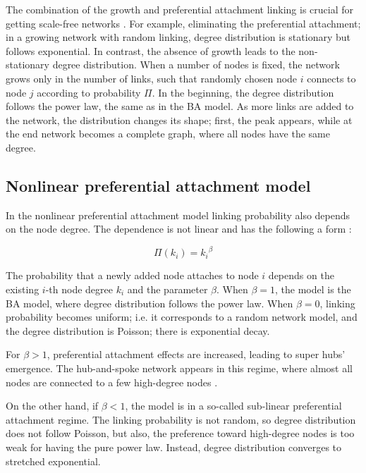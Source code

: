 The combination of the growth and preferential attachment linking is crucial for getting scale-free networks \cite{barabasi1999}. For example, eliminating the preferential attachment; in a growing network with random linking, degree distribution is stationary but follows exponential. In contrast, the absence of growth leads to the non-stationary degree distribution. When a number of nodes is fixed, the network grows only in the number of links, such that randomly chosen node $i$ connects to node $j$ according to probability $\Pi$. In the beginning, the degree distribution follows the power law, the same as in the BA model. As more links are added to the network, the distribution changes its shape; first, the peak appears, while at the end network becomes a complete graph, where all nodes have the same degree.  

\subsection{Nonlinear preferential attachment model}

In the nonlinear preferential attachment model linking probability also depends on the node degree. The dependence is not linear and has the following a form \cite{krapivsky2001}:

\begin{equation}
\Pi(k_i) = {k_i}^{\beta}
\end{equation} 

The probability that a newly added node attaches to node $i$ depends on the existing $i$-th node degree $k_i$ and the parameter $\beta$. When $\beta=1$, the model is the BA model, where degree distribution follows the power law. When $\beta=0$, linking probability becomes uniform; i.e. it corresponds to a random network model, and the degree distribution is Poisson; there is exponential decay. 

For $\beta>1$, preferential attachment effects are increased, leading to super hubs' emergence. The hub-and-spoke network appears in this regime, where almost all nodes are connected to a few high-degree nodes \cite{krapivsky2001}. %

On the other hand, if $\beta<1$, the model is in a so-called sub-linear preferential attachment regime. The linking probability is not random, so degree distribution does not follow Poisson, but also, the preference toward high-degree nodes is too weak for having the pure power law. Instead, degree distribution converges to stretched exponential.


